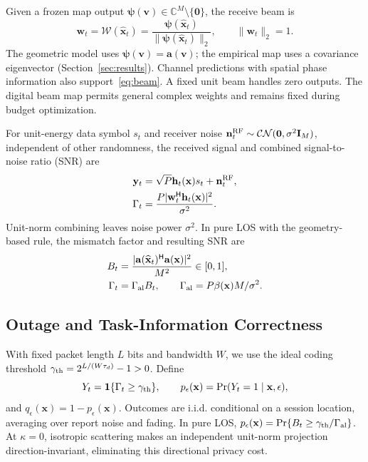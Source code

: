 Given a frozen map output $\boldsymbol\psi(\mathbf v)\in\mathbb C^M\setminus\{\mathbf0\}$, the receive beam is
\begin{equation}
 \mathbf w_t=\mathcal W(\widehat{\mathbf x}_t)
 =\frac{\boldsymbol\psi(\widehat{\mathbf x}_t)}
 {\|\boldsymbol\psi(\widehat{\mathbf x}_t)\|_2},
 \qquad \|\mathbf w_t\|_2=1.
 \label{eq:beam}
\end{equation}
The geometric model uses $\boldsymbol\psi(\mathbf v)=\mathbf a(\mathbf v)$; the empirical map uses a covariance eigenvector (Section~\ref{sec:results}). Channel predictions with spatial phase information also support~\eqref{eq:beam}. A fixed unit beam handles zero outputs. The digital beam map permits general complex weights and remains fixed during budget optimization.

For unit-energy data symbol $s_t$ and receiver noise $\mathbf n_t^{\rm RF}\sim\mathcal{CN}(\mathbf0,\sigma^2\mathbf I_M)$, independent of other randomness, the received signal and combined signal-to-noise ratio (SNR) are
\begin{align}
 \mathbf y_t&=\sqrt P\mathbf h_t(\mathbf x)s_t+\mathbf n_t^{\rm RF},\nonumber\\
 \Gamma_t&=\frac{P|\mathbf w_t^{\mathsf H}\mathbf h_t(\mathbf x)|^2}{\sigma^2}.
 \label{eq:snr}
\end{align}
Unit-norm combining leaves noise power $\sigma^2$. In pure LOS with the geometry-based rule, the mismatch factor and resulting SNR are
\begin{align}
 B_t&=\frac{|\mathbf a(\widehat{\mathbf x}_t)^{\mathsf H}
                   \mathbf a(\mathbf x)|^2}{M^2}\in[0,1],\nonumber\\
 \Gamma_t&=\Gamma_{\rm al}B_t,
 \qquad \Gamma_{\rm al}=P\beta(\mathbf x)M/\sigma^2.
 \label{eq:mismatch}
\end{align}


\subsection{Outage and Task-Information Correctness}
With fixed packet length $L$ bits and bandwidth $W$, we use the ideal coding threshold $\gamma_{\rm th}=2^{L/(W\tau_d)}-1>0$. Define
\begin{equation}
 Y_t=\mathbf1\{\Gamma_t\ge\gamma_{\rm th}\},\qquad
 p_\epsilon(\mathbf x)=\Pr(Y_t=1\mid\mathbf x,\epsilon),
 \label{eq:success}
\end{equation}
and $q_\epsilon(\mathbf x)=1-p_\epsilon(\mathbf x)$. Outcomes are i.i.d. conditional on a session location, averaging over report noise and fading. In pure LOS, $p_\epsilon(\mathbf x)=\Pr\{B_t\ge\gamma_{\rm th}/\Gamma_{\rm al}\}$. At $\kappa=0$, isotropic scattering makes an independent unit-norm projection direction-invariant, eliminating this directional privacy cost.

